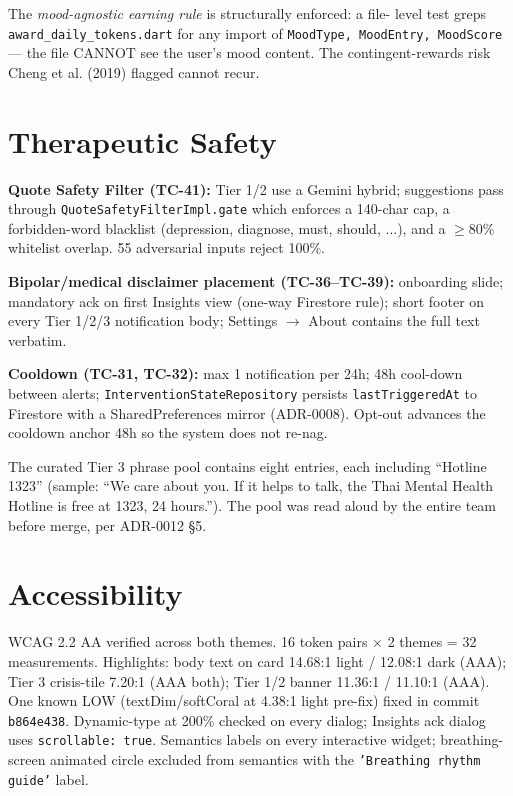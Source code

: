 \documentclass[11pt,a4paper]{article}
\begin{document}
The \emph{mood-agnostic earning rule} is structurally enforced: a file-
level test greps \texttt{award\_daily\_tokens.dart} for any import of
\texttt{MoodType, MoodEntry, MoodScore} --- the file CANNOT see the user's
mood content. The contingent-rewards risk Cheng et al. (2019) flagged
cannot recur.

\section{Therapeutic Safety}

\textbf{Quote Safety Filter (TC-41):} Tier 1/2 use a Gemini hybrid;
suggestions pass through \texttt{QuoteSafetyFilterImpl.gate} which
enforces a 140-char cap, a forbidden-word blacklist (depression,
diagnose, must, should, $\ldots$), and a $\geq 80\%$ whitelist overlap.
55 adversarial inputs reject 100\%.

\textbf{Bipolar/medical disclaimer placement (TC-36--TC-39):} onboarding
slide; mandatory ack on first Insights view (one-way Firestore rule);
short footer on every Tier 1/2/3 notification body; Settings $\to$ About
contains the full text verbatim.

\textbf{Cooldown (TC-31, TC-32):} max 1 notification per 24h; 48h
cool-down between alerts; \texttt{InterventionStateRepository} persists
\texttt{lastTriggeredAt} to Firestore with a SharedPreferences mirror
(ADR-0008). Opt-out advances the cooldown anchor 48h so the system does
not re-nag.

The curated Tier 3 phrase pool contains eight entries, each including
``Hotline 1323'' (sample: ``We care about you. If it helps to talk, the
Thai Mental Health Hotline is free at 1323, 24 hours.''). The pool was
read aloud by the entire team before merge, per ADR-0012 §5.

\section{Accessibility}

WCAG 2.2 AA verified across both themes. 16 token pairs $\times$ 2
themes = 32 measurements. Highlights: body text on card 14.68:1 light /
12.08:1 dark (AAA); Tier 3 crisis-tile 7.20:1 (AAA both); Tier 1/2 banner
11.36:1 / 11.10:1 (AAA). One known LOW (textDim/softCoral at 4.38:1 light
pre-fix) fixed in commit \texttt{b864e438}. Dynamic-type at 200\% checked
on every dialog; Insights ack dialog uses \texttt{scrollable: true}.
Semantics labels on every interactive widget; breathing-screen animated
circle excluded from semantics with the \texttt{'Breathing rhythm
guide'} label.
\end{document}
